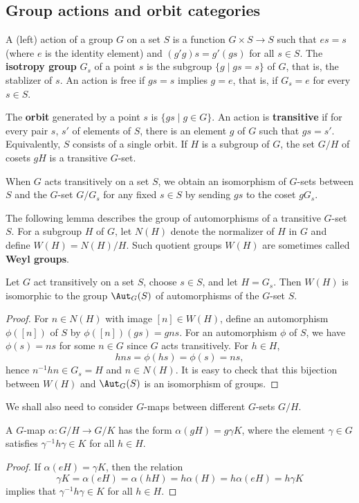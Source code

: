 \subsection{Group actions and orbit categories}
A (left) action of a group $G$ on a set $S$ is a function $G\times S\to S$ such that $es=s$ (where $e$ is the identity element) and $(g'g)s=g'(gs)$ for all $s\in S$. The \textbf{isotropy group} $G_s$ of a point $s$ is the subgroup $\{g\mid gs=s\}$ of $G$, that is, the stablizer of $s$. An action is free if $gs=s$ implies $g=e$, that is, if $G_s=e$ for every $s\in S$.\par
The \textbf{orbit} generated by a point $s$ is $\{gs\mid g\in G\}$. An action is \textbf{transitive} if for every pair $s$, $s'$ of elements of $S$, there is an element $g$ of $G$ such that $gs=s'$. Equivalently, $S$ consists of a single orbit. If $H$ is a subgroup of $G$, the set $G/H$ of cosets $gH$ is a transitive $G$-set.\par 
When $G$ acts transitively on a set $S$, we obtain an isomorphism of $G$-sets between $S$ and the $G$-set $G/G_s$ for any fixed $s\in S$ by sending $gs$ to the coset $gG_s$.\par
The following lemma describes the group of automorphisms of a transitive $G$-set $S$. For a subgroup $H$ of $G$, let $N(H)$ denote the normalizer of $H$ in $G$ and define $W(H)=N(H)/H$. Such quotient groups $W(H)$ are sometimes called \textbf{Weyl groups}.
\begin{lemma}
Let $G$ act transitively on a set $S$, choose $s\in S$, and let $H=G_s$. Then $W(H)$ is isomorphic to the group $\Aut_G(S)$ of automorphisms of the $G$-set $S$.
\end{lemma}
\begin{proof}
For $n\in N(H)$ with image $[n]\in W(H)$, define an automorphism $\phi([n])$ of $S$ by $\phi([n])(gs)=gns$. For an automorphism $\phi$ of $S$, we have $\phi(s)=ns$ for some $n\in G$ since $G$ acts transitively. For $h\in H$, \[hns=\phi(hs)=\phi(s)=ns,\]
hence $n^{-1}hn\in G_s=H$ and $n\in N(H)$. It is easy to check that this bijection between $W(H)$ and $\Aut_G(S)$ is an isomorphism of groups.
\end{proof}
We shall also need to consider $G$-maps between different $G$-sets $G/H$.
\begin{lemma}\label{Weyl group auto}
A $G$-map $\alpha:G/H\to G/K$ has the form $\alpha(gH)=g\gamma K$, where the
element $\gamma\in G$ satisfies $\gamma^{-1}h\gamma\in K$ for all $h\in H$.
\end{lemma}
\begin{proof}
If $\alpha(eH)=\gamma K$, then the relation
\[\gamma K=\alpha(eH)=\alpha(hH)=h\alpha(H)=h\alpha(eH)=h\gamma K\]
implies that $\gamma^{-1}h\gamma\in K$ for all $h\in H$.
\end{proof}
